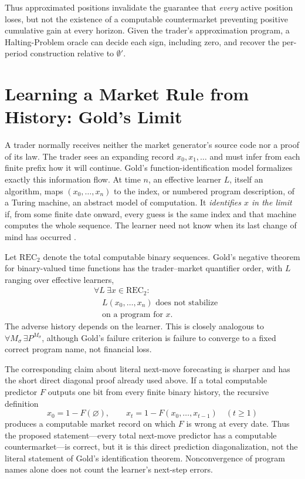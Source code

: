 \documentclass[aps,pra,reprint,superscriptaddress,amsmath,amssymb,floatfix]{revtex4-2}
\theoremstyle{plain}
\theoremstyle{definition}
\theoremstyle{remark}
\begin{document}
Thus approximated positions invalidate the guarantee that \emph{every}
active position loses, but not the existence of a computable countermarket
preventing positive cumulative gain at every horizon. Given the trader's
approximation program, a Halting-Problem oracle can decide each sign,
including zero, and recover the per-period construction relative to
\(\emptyset'\).

\section{Learning a Market Rule from History: Gold's Limit}
\label{sec:learning}

A trader normally receives neither the market generator's source code nor a
proof of its law. The trader sees an expanding record
\(x_0,x_1,\ldots\) and must infer from each finite prefix how it will continue.
Gold's function-identification model formalizes exactly this information flow.
At time \(n\), an effective learner \(L\), itself an algorithm, maps
\((x_0,\ldots,x_n)\) to the index, or numbered program description, of a
Turing machine, an abstract model of computation. It
\emph{identifies \(x\) in the limit} if, from some finite date onward, every
guess is the same index and that machine computes the whole sequence. The
learner need not know when its last change of mind has occurred
\cite{go-65,go-67}.

Let \(\mathrm{REC}_2\) denote the total computable binary sequences. Gold's
negative theorem for binary-valued time functions has the trader--market
quantifier order, with \(L\) ranging over effective learners,
\begin{equation}
  \begin{aligned}
  &\forall L\ \exists x\in\mathrm{REC}_2: \\
  &\quad L(x_0,\ldots,x_n)\text{ does not stabilize}\\
  &\quad \text{on a program for }x .
  \end{aligned}
  \label{eq:goldquantifiers}
\end{equation}
The adverse history depends on the learner. This is closely analogous to
\(\forall M_\sigma\,\exists P^{M_\sigma}\), although Gold's failure criterion
is failure to converge to a fixed correct program name, not financial loss.

The corresponding claim about literal next-move forecasting is sharper and
has the short direct diagonal proof already used above. If a total computable
predictor \(F\) outputs one bit from every finite binary history, the recursive
definition
\[
  x_0=1-F(\varnothing),
  \qquad
  x_t=1-F(x_0,\ldots,x_{t-1})\quad(t\geq1)
\]
produces a computable market record on which \(F\) is wrong at every date.
Thus the proposed statement---every total next-move predictor has a computable
countermarket---is correct, but it is this direct prediction diagonalization,
not the literal statement of Gold's identification theorem. Nonconvergence of
program names alone does not count the learner's next-step errors.
\end{document}
